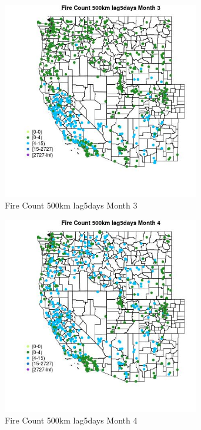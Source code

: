 \begin{figure} 
\centering  
\includegraphics[width=0.77\textwidth]{Code_Outputs/Report_ML_input_PM25_Step4_part_f_de_duplicated_aves_prioritize_24hr_obswNAs_MapObsMo3Fire_Count_500km_lag5days.jpg} 
\caption{\label{fig:Report_ML_input_PM25_Step4_part_f_de_duplicated_aves_prioritize_24hr_obswNAsMapObsMo3Fire_Count_500km_lag5days}Fire Count 500km lag5days Month 3} 
\end{figure} 
 

\begin{figure} 
\centering  
\includegraphics[width=0.77\textwidth]{Code_Outputs/Report_ML_input_PM25_Step4_part_f_de_duplicated_aves_prioritize_24hr_obswNAs_MapObsMo4Fire_Count_500km_lag5days.jpg} 
\caption{\label{fig:Report_ML_input_PM25_Step4_part_f_de_duplicated_aves_prioritize_24hr_obswNAsMapObsMo4Fire_Count_500km_lag5days}Fire Count 500km lag5days Month 4} 
\end{figure} 
 

